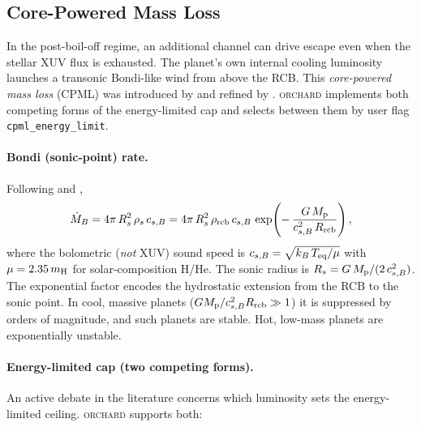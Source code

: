 \documentclass{aastex701}
\newcommand{\Mdot}{\dot{M}}
\newcommand{\Mp}{M_{\rm p}}
\newcommand{\Rrcb}{R_{\rm rcb}}
\newcommand{\Teq}{T_{\rm eq}}
\newcommand{\orchard}{\textsc{orchard}}
\begin{document}
\subsection{Core-Powered Mass Loss}\label{subsec:cpml}

In the post-boil-off regime, an additional channel can drive escape
even when the stellar XUV flux is exhausted.  The planet's own
internal cooling luminosity launches a transonic Bondi-like wind from
above the RCB.  This \emph{core-powered mass loss} (CPML) was
introduced by \citet{Ginzburg2016, Ginzburg2018} and refined by
\citet{Gupta2019, Rogers2021}.  \orchard{} implements both competing
forms of the energy-limited cap and selects between them by user flag
\texttt{cpml\_energy\_limit}.

\paragraph{Bondi (sonic-point) rate.}  Following
\citet[][their Eq.~6]{Gupta2019} and \citet[][their Eq.~16]{Rogers2021},
\begin{equation}\label{eq:mdot_bondi}
  \Mdot_{B}
    = 4\pi\,R_{s}^{2}\,\rho_{s}\,c_{s,B}
    = 4\pi\,R_{s}^{2}\,\rho_{\rm rcb}\,c_{s,B}\,
      \exp\!\left(-\,\frac{G\,\Mp}{c_{s,B}^{2}\,\Rrcb}\right),
\end{equation}
where the bolometric (\emph{not} XUV) sound speed is
$c_{s,B} = \sqrt{k_{B}\,\Teq/\mu}$ with $\mu = 2.35\,m_{\rm H}$ for
solar-composition H/He.  The sonic radius is
$R_{s} = G\,\Mp/(2\,c_{s,B}^{2})$.  The exponential factor encodes the
hydrostatic extension from the RCB to the sonic point.  In cool, massive
planets ($G\Mp/c_{s,B}^{2}\Rrcb \gg 1$) it is suppressed by orders
of magnitude, and such planets are stable.  Hot, low-mass planets are
exponentially unstable.

\paragraph{Energy-limited cap (two competing forms).}  An active
debate in the literature concerns which luminosity sets the
energy-limited ceiling.  \orchard{} supports both:
\end{document}
